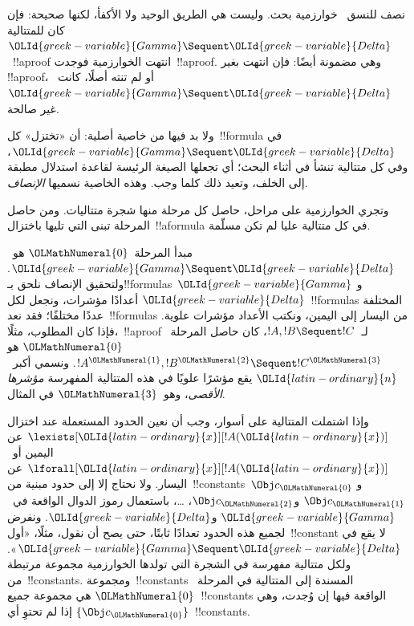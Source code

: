 \documentclass[../../../include/open-logic-section]{subfiles}
\begin{document}


نصف للنسق~ خوارزمية بحث. وليست هي الطريق الوحيد ولا الأكفأ،
لكنها صحيحة: فإن كان للمتتالية~$\OLId{greek-variable}{Gamma}\Sequent\OLId{greek-variable}{Delta}$~!!a{proof} انتهت
الخوارزمية فوجدت~!!a{proof}. وهي مضمونة أيضًا: فإن انتهت بغير
!!a{proof}، أو لم تنته أصلًا، كانت~$\OLId{greek-variable}{Gamma}\Sequent\OLId{greek-variable}{Delta}$ غير صالحة.

ولا بد فيها من خاصية أصلية: أن «تختزل» كل~!!{formula} في
$\OLId{greek-variable}{Gamma}\Sequent\OLId{greek-variable}{Delta}$، وفي كل متتالية تنشأ في أثناء البحث؛ أي تجعلها
الصيغة الرئيسة لقاعدة استدلال مطبقة إلى الخلف، وتعيد ذلك كلما وجب. وهذه
الخاصية نسميها \emph{الإنصاف}.

وتجري الخوارزمية على مراحل، حاصل كل مرحلة منها شجرة متتاليات. ومن حاصل
المرحلة تبنى التي تليها باختزال~!!a{formula} في كل متتالية عليا لم تكن
مسلّمة.

مبدأ المرحلة~$\OLMathNumeral{0}$ هو~$\OLId{greek-variable}{Gamma}\Sequent\OLId{greek-variable}{Delta}$. ولتحقيق الإنصاف نلحق
بـ!!{formula}s~$\OLId{greek-variable}{Gamma}$ و$\OLId{greek-variable}{Delta}$ أعدادًا مؤشرات، ونجعل لكل~!!{formula}s
المختلفة عددًا مختلفًا؛ فقد نعد~!!{formula}s من اليسار إلى اليمين، ونكتب
الأعداد مؤشرات علوية. فإذا كان المطلوب، مثلًا،~!!a{proof}
لـ~$!A,!B\Sequent !C$، كان حاصل المرحلة~$\OLMathNumeral{0}$ هو
$!A^\OLMathNumeral{1},!B^\OLMathNumeral{2}\Sequent !C^\OLMathNumeral{3}$. ونسمي أكبر~$\OLId{latin-ordinary}{n}$ يقع مؤشرًا علويًا في هذه
المتتالية المفهرسة \emph{مؤشرها الأقصى}، وهو~$\OLMathNumeral{3}$ في المثال.

وإذا اشتملت المتتالية على أسوار، وجب أن نعين الحدود المستعملة عند اختزال
$\lexists[\OLId{latin-ordinary}{x}][!A(\OLId{latin-ordinary}{x})]$ عن اليمين أو~$\lforall[\OLId{latin-ordinary}{x}][!A(\OLId{latin-ordinary}{x})]$ عن اليسار.
ولا نحتاج إلا إلى حدود مبنية من~!!{constant}s~$\Obj c_\OLMathNumeral{0}$ و
$\Obj c_\OLMathNumeral{1}$ و$\Obj c_\OLMathNumeral{2}$، \dots، باستعمال رموز الدوال الواقعة في~$\OLId{greek-variable}{Gamma}$
و$\OLId{greek-variable}{Delta}$. ونفرض لجميع هذه الحدود تعدادًا ثابتًا، حتى يصح أن نقول، مثلًا،
«أول~!!{constant} لا يقع في
$\OLId{greek-variable}{Gamma}\Sequent\OLId{greek-variable}{Delta}$». ولكل متتالية مفهرسة في الشجرة التي تولدها
الخوارزمية مجموعة مرتبطة من~!!{constant}s. ومجموعة~!!{constant}s المسندة إلى المتتالية
في المرحلة~$\OLMathNumeral{0}$ هي مجموعة جميع~!!{constant}s الواقعة فيها إن وُجدت، وهي
$\{\Obj c_\OLMathNumeral{0}\}$ إذا لم تحتوِ أي~!!{constant}s.
\end{document}
